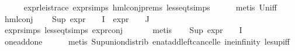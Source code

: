 \begin{isabellebody}
\ \ \ \ \isamarkupfalse%
\ expr{\isacharunderscore}{\kern0pt}{}{\isacharunderscore}{\kern0pt}le{\isacharunderscore}{\kern0pt}{}{\isacharunderscore}{\kern0pt}is{\isacharunderscore}{\kern0pt}trace\ expr{\isachardot}{\kern0pt}simps\ hml{\isacharunderscore}{\kern0pt}conj{\isachardot}{\kern0pt}prems\ less{\isacharunderscore}{\kern0pt}eq{\isacharunderscore}{\kern0pt}t{\isachardot}{\kern0pt}simps\isanewline
\ \ \ \ \isamarkupfalse%
\ {\isacharparenleft}{\kern0pt}metis\ Un{\isacharunderscore}{\kern0pt}iff{\isacharparenright}{\kern0pt}\isanewline
\ \ \isamarkupfalse%
\ hml{\isacharunderscore}{\kern0pt}conj\ \isamarkupfalse%
\ {\isachardoublequoteopen}{}\ {\isacharplus}{\kern0pt}\ Sup\ {\isacharparenleft}{\kern0pt}{\isacharparenleft}{\kern0pt}expr{\isacharunderscore}{\kern0pt}{}\ {\isasymcirc}\ {\isasymPhi}{\isacharparenright}{\kern0pt}\ {\isacharbackquote}{\kern0pt}\ I\ {\isasymunion}\ {\isacharparenleft}{\kern0pt}expr{\isacharunderscore}{\kern0pt}{}\ {\isasymcirc}\ {\isasymPhi}{\isacharparenright}{\kern0pt}\ {\isacharbackquote}{\kern0pt}\ J{\isacharparenright}{\kern0pt}\ {\isasymle}\ {}{\isachardoublequoteclose}\isanewline
\ \ \ \ \isamarkupfalse%
\ expr{\isachardot}{\kern0pt}simps\ less{\isacharunderscore}{\kern0pt}eq{\isacharunderscore}{\kern0pt}t{\isachardot}{\kern0pt}simps\ expr{\isacharunderscore}{\kern0pt}{}{\isacharunderscore}{\kern0pt}conj\ \isanewline
\ \ \ \ \isamarkupfalse%
\ metis\isanewline
\ \ \isamarkupfalse%
\ {\isachardoublequoteopen}Sup\ {\isacharparenleft}{\kern0pt}{\isacharparenleft}{\kern0pt}expr{\isacharunderscore}{\kern0pt}{}\ {\isasymcirc}\ {\isasymPhi}{\isacharparenright}{\kern0pt}\ {\isacharbackquote}{\kern0pt}\ I{\isacharparenright}{\kern0pt}\ {\isasymle}\ {}{\isachardoublequoteclose}\isanewline
\ \ \ \ \isamarkupfalse%
\ one{\isacharunderscore}{\kern0pt}add{\isacharunderscore}{\kern0pt}one\isanewline
\ \ \ \ \isamarkupfalse%
\ {\isacharparenleft}{\kern0pt}metis\ Sup{\isacharunderscore}{\kern0pt}union{\isacharunderscore}{\kern0pt}distrib\ enat{\isacharunderscore}{\kern0pt}add{\isacharunderscore}{\kern0pt}left{\isacharunderscore}{\kern0pt}cancel{\isacharunderscore}{\kern0pt}le\ i{}{\isacharunderscore}{\kern0pt}ne{\isacharunderscore}{\kern0pt}infinity\ le{\isacharunderscore}{\kern0pt}sup{\isacharunderscore}{\kern0pt}iff{\isacharparenright}{\kern0pt}\isanewline
\ \ \isamarkupfalse%

\end{isabellebody}
